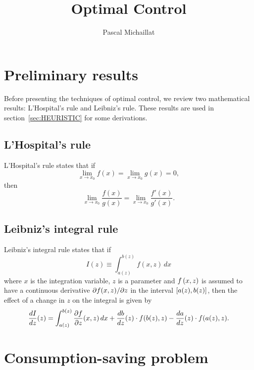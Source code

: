 \documentclass[letterpaper, 11pt, leqno]{article}
\begin{document}
\title{Optimal Control}
\author{Pascal Michaillat}
\date{}
\begin{titlepage}
\maketitle
\tableofcontents
\end{titlepage}

\section{Preliminary results}

Before presenting the techniques of optimal control, we review two mathematical results: L'Hospital's rule and Leibniz's rule. These results are used in section~\ref{sec:HEURISTIC} for some derivations.

\subsection{L'Hospital's rule}

L'Hospital's rule states that if 
\begin{equation*}
\lim_{x\to x_{0}}f(x) =\lim_{x\to x_{0}}g(x) =0,
\end{equation*}
then 
\begin{equation*}
\lim_{x\to x_{0}}\frac{f(x)}{g(x)}=\lim_{x\to x_{0}}\frac{f'(x)}{g'(x)}.
\end{equation*}

\subsection{Leibniz's integral rule}

Leibniz's integral rule states that if
\begin{equation*}
I(z) \equiv \int_{a(z)}^{b(z)}f(x,z)\,dx
\end{equation*}
where $x$ is the integration variable, $z$ is a parameter and $f\left( x,z \right)$ is assumed to have a continuous derivative $\pdx{f(x,z)}{z}$ in the interval $\left[ a(z),b(z) \right]$, then the effect of a change in $z$ on the integral is given by
\begin{equation*}
\od{I}{z}(z) =\int_{a(z)}^{b(z)} \pd{f}{z}(x,z)\,dx+\od{b}{z}(z) \cdot f(b(z),z) -\od{a}{z}(z) \cdot f(a(z),z).
\end{equation*}

\section{Consumption-saving problem}
\end{document}
